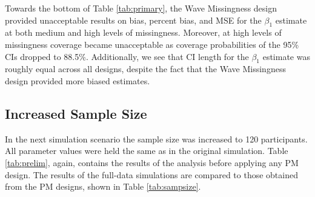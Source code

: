\documentclass{svjour3}\usepackage[]{graphicx}\usepackage[]{color}
\begin{document}
Towards the bottom of Table \ref{tab:primary}, the Wave Missingness design provided unacceptable results on bias, percent bias, and MSE for the $\beta_1$ estimate at both medium and high levels of missingness. Moreover, at high levels of missingness coverage became unacceptable as coverage probabilities of the 95\% CIs dropped to 88.5\%.  Additionally, we see that CI length for the $\beta_1$ estimate was roughly equal across all designs, despite the fact that the Wave Missingness design provided more biased estimates. \par

\subsection{Increased Sample Size}
\label{sec:3.2}
In the next simulation scenario the sample size was increased to 120 participants. All parameter values were held the same as in the original simulation. Table \ref{tab:prelim}, again, contains the results of the analysis before applying any PM design. The results of the full-data simulations are compared to those obtained from the PM designs, shown in Table \ref{tab:sampsize}. \par
\end{document}
